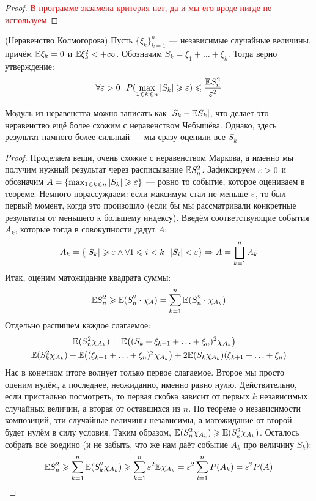 \begin{proof}
	\textcolor{red}{В программе экзамена критерия нет, да и мы его вроде нигде не используем}
\end{proof}

\begin{theorem} (Неравенство Колмогорова)
	Пусть $\{\xi_k\}_{k = 1}^n$ --- независимые случайные величины, причём $\mathbb{E}\xi_k = 0$ и $\mathbb{E}\xi_k^2 < +\infty$. Обозначим $S_k = \xi_1 + \ldots + \xi_k$. Тогда верно утверждение:
	\[
		\forall \varepsilon > 0\ \ P(\max_{1 \leqslant k \leqslant n} |S_k| \geqslant \varepsilon) \leqslant \frac{\mathbb{E} S_n^2}{\varepsilon^2}
	\]
\end{theorem}

\begin{note}
	Модуль из неравенства можно записать как $|S_k - \mathbb{E} S_k|$, что делает это неравенство ещё более схожим с неравенством Чебышёва. Однако, здесь результат намного более сильный --- мы сразу оценили все $S_k$
\end{note}

\begin{proof}
	Проделаем вещи, очень схожие с неравенством Маркова, а именно мы получим нужный результат через расписывание $\mathbb{E} S_n^2$. Зафиксируем $\varepsilon > 0$ и обозначим $A = \{\max_{1 \leqslant k \leqslant n} |S_k| \geqslant \varepsilon\}$ --- ровно то событие, которое оцениваем в теореме. Немного порассуждаем: если максимум стал не меньше $\varepsilon$, то был первый момент, когда это произошло (если бы мы рассматривали конкретные результаты от меньшего к большему индексу). Введём соответствующие события $A_k$, которые тогда в совокупности дадут $A$:
	\[
		A_k = \{|S_k| \geqslant \varepsilon \wedge \forall 1 \leqslant i < k\ \ |S_i| < \varepsilon\}\Rightarrow A = \bigsqcup_{k = 1}^n A_k
	\]
	Итак, оценим матожидание квадрата суммы:
	\[
		\mathbb{E} S_n^2 \geqslant \mathbb{E} (S_n^2 \cdot \chi_A) = \sum_{k = 1}^n \mathbb{E} (S_n^2 \cdot \chi_{A_k})
	\]
	Отдельно распишем каждое слагаемое:
	\begin{multline*}
		\mathbb{E} (S_n^2 \chi_{A_k}) = \mathbb{E}\big((S_k + \xi_{k + 1} + \ldots + \xi_n)^2 \chi_{A_k}\big) =
		\\
		\mathbb{E} (S_k^2\chi_{A_k}) + \mathbb{E}\big((\xi_{k + 1} + \ldots + \xi_n)^2\chi_{A_k}\big) + 2\mathbb{E}(S_k\chi_{A_k})(\xi_{k + 1} + \ldots + \xi_n)
	\end{multline*}
	Нас в конечном итоге волнует только первое слагаемое. Второе мы просто оценим нулём, а последнее, неожиданно, именно равно нулю. Действительно, если пристально посмотреть, то первая скобка зависит от первых $k$ независимых случайных величин, а вторая от оставшихся из $n$. По теореме о независимости композиций, эти случайные величины независимы, а матожидание от второй будет нулём в силу условия. Таким образом, $\mathbb{E}(S_n^2\chi_{A_k}) \geqslant \mathbb{E}(S_k^2\chi_{A_k})$. Осталось собрать всё воедино (и не забыть, что же нам даёт событие $A_k$ про величину $S_k$):
	\[
		\mathbb{E} S_n^2 \geqslant \sum_{k = 1}^n \mathbb{E}(S_k^2\chi_{A_k}) \geqslant \sum_{k = 1}^n \varepsilon^2\mathbb{E}\chi_{A_k} = \varepsilon^2 \sum_{i = 1}^n P(A_k) = \varepsilon^2 P(A)
	\]
\end{proof}

